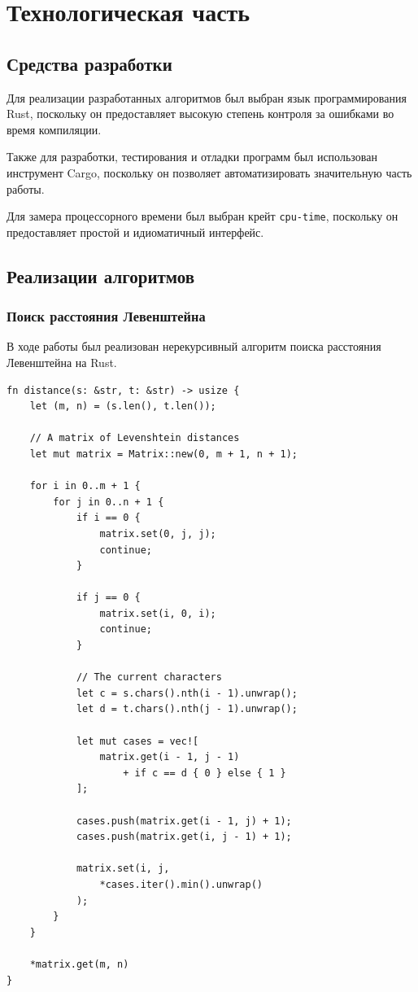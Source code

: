 \documentclass{report}
\begin{document}
\chapter{Технологическая часть}

\section{Средства разработки}

Для реализации разработанных алгоритмов был выбран язык
программирования Rust, поскольку он предоставляет высокую степень
контроля за ошибками во время компиляции.

Также для разработки, тестирования и отладки программ был
использован инструмент Cargo, поскольку он позволяет
автоматизировать значительную часть работы.

Для замера процессорного времени был выбран крейт
\texttt{cpu-time}, поскольку он предоставляет простой и
идиоматичный интерфейс.

\section{Реализации алгоритмов}

\subsection{Поиск расстояния Левенштейна}

В ходе работы был реализован нерекурсивный алгоритм поиска
расстояния Левенштейна на Rust.

\begin{lstlisting}[caption=Реализация нерекурсивного алгоритма
    поиска $\Delta_{\textup{Л}}$]
fn distance(s: &str, t: &str) -> usize {
    let (m, n) = (s.len(), t.len());

    // A matrix of Levenshtein distances
    let mut matrix = Matrix::new(0, m + 1, n + 1);

    for i in 0..m + 1 {
        for j in 0..n + 1 {
            if i == 0 {
                matrix.set(0, j, j);
                continue;
            }

            if j == 0 {
                matrix.set(i, 0, i);
                continue;
            }

            // The current characters
            let c = s.chars().nth(i - 1).unwrap();
            let d = t.chars().nth(j - 1).unwrap();

            let mut cases = vec![
                matrix.get(i - 1, j - 1)
                    + if c == d { 0 } else { 1 }
            ];

            cases.push(matrix.get(i - 1, j) + 1);
            cases.push(matrix.get(i, j - 1) + 1);

            matrix.set(i, j,
                *cases.iter().min().unwrap()
            );
        }
    }

    *matrix.get(m, n)
}
\end{lstlisting}
\end{document}
